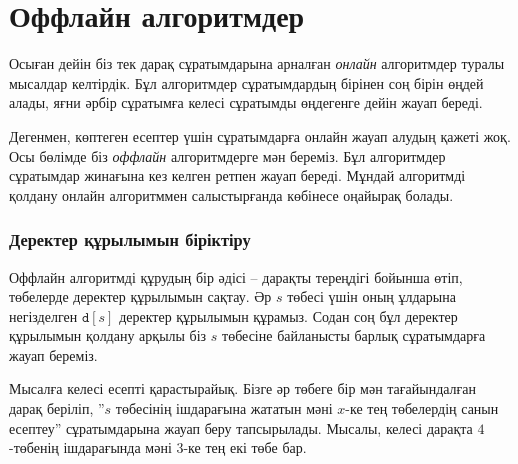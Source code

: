 \section{Оффлайн алгоритмдер}

Осыған дейін біз тек дарақ сұратымдарына арналған 
\emph{онлайн} алгоритмдер туралы мысалдар келтірдік.
Бұл алгоритмдер сұратымдардың бірінен соң бірін өңдей алады,
яғни әрбір сұратымға келесі сұратымды өңдегенге дейін
жауап береді.

Дегенмен, көптеген есептер үшін сұратымдарға онлайн жауап
алудың қажеті жоқ.
Осы бөлімде біз \emph{оффлайн} алгоритмдерге мән береміз.
Бұл алгоритмдер сұратымдар жинағына кез келген ретпен жауап береді.
Мұндай алгоритмді қолдану онлайн 
алгоритммен салыстырғанда көбінесе оңайырақ болады.

\subsubsection{Деректер құрылымын біріктіру}

Оффлайн алгоритмді құрудың бір әдісі -- дарақты тереңдігі бойынша
өтіп, төбелерде деректер құрылымын сақтау.
Әр $s$ төбесі үшін оның ұлдарына негізделген $\texttt{d}[s]$ 
деректер құрылымын құрамыз.
Содан соң бұл деректер құрылымын қолдану арқылы біз $s$ төбесіне
байланысты барлық сұратымдарға жауап береміз.

Мысалға келесі есепті қарастырайық.
Бізге әр төбеге бір мән тағайындалған дарақ беріліп,
''$s$ төбесінің ішдарағына
жататын мәні $x$-ке тең төбелердің санын есептеу''
сұратымдарына жауап беру тапсырылады.
Мысалы, келесі дарақта $4$-төбенің ішдарағында 
мәні 3-ке тең екі төбе бар.

